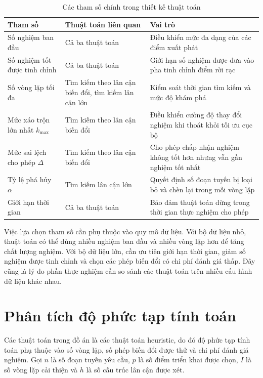 \begin{table}[H]
\centering
\caption{Các tham số chính trong thiết kế thuật toán}
\label{tab:chapter4-parameters}
\begin{tabular}{|p{3.5cm}|p{4.2cm}|p{5.8cm}|}
\hline
\textbf{Tham số} & \textbf{Thuật toán liên quan} & \textbf{Vai trò} \\
\hline
Số nghiệm ban đầu & Cả ba thuật toán & Điều khiển mức đa dạng của các điểm xuất phát \\
\hline
Số nghiệm tốt được tinh chỉnh & Cả ba thuật toán & Giới hạn số nghiệm được đưa vào pha tinh chỉnh điểm rời rạc \\
\hline
Số vòng lặp tối đa & Tìm kiếm theo lân cận biến đổi, tìm kiếm lân cận lớn & Kiểm soát thời gian tìm kiếm và mức độ khám phá \\
\hline
Mức xáo trộn lớn nhất $k_{\max}$ & Tìm kiếm theo lân cận biến đổi & Điều khiển cường độ thay đổi nghiệm khi thoát khỏi tối ưu cục bộ \\
\hline
Mức sai lệch cho phép $\Delta$ & Tìm kiếm theo lân cận biến đổi & Cho phép chấp nhận nghiệm không tốt hơn nhưng vẫn gần nghiệm tốt nhất \\
\hline
Tỷ lệ phá hủy $\alpha$ & Tìm kiếm lân cận lớn & Quyết định số đoạn tuyến bị loại bỏ và chèn lại trong mỗi vòng lặp \\
\hline
Giới hạn thời gian & Cả ba thuật toán & Bảo đảm thuật toán dừng trong thời gian thực nghiệm cho phép \\
\hline
\end{tabular}
\end{table}

Việc lựa chọn tham số cần phụ thuộc vào quy mô dữ liệu. Với bộ dữ liệu nhỏ, thuật toán có thể dùng nhiều nghiệm ban đầu và nhiều vòng lặp hơn để tăng chất lượng nghiệm. Với bộ dữ liệu lớn, cần ưu tiên giới hạn thời gian, giảm số nghiệm được tinh chỉnh và chọn các phép biến đổi có chi phí đánh giá thấp. Đây cũng là lý do phần thực nghiệm cần so sánh các thuật toán trên nhiều cấu hình dữ liệu khác nhau.

\section{Phân tích độ phức tạp tính toán}

Các thuật toán trong đồ án là các thuật toán heuristic, do đó độ phức tạp tính toán phụ thuộc vào số vòng lặp, số phép biến đổi được thử và chi phí đánh giá nghiệm. Gọi $n$ là số đoạn tuyến yêu cầu, $p$ là số điểm triển khai được chọn, $I$ là số vòng lặp cải thiện và $h$ là số cấu trúc lân cận được xét.

